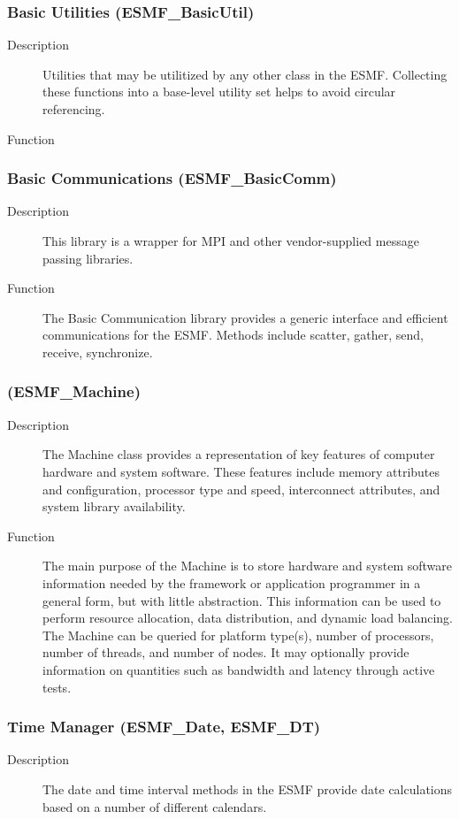 \subsubsection{Basic Utilities (ESMF\_BasicUtil)} 
\begin{description}
\item [Description] Utilities that may be utilitized by any other class in the ESMF.  
Collecting these functions into a base-level utility set helps to 
avoid circular referencing.
\item [Function] 
\end{description}

\subsubsection{Basic Communications (ESMF\_BasicComm)}
\begin{description}
\item [Description] This library is a wrapper for MPI and other vendor-supplied 
message passing libraries.
\item [Function] The Basic Communication library provides a generic interface
and efficient communications for the ESMF.  Methods include scatter, gather, send,
receive, synchronize. 
\end{description}

\subsubsection{ (ESMF\_Machine)} 
\begin{description}
\item [Description] The Machine class provides a representation of 
key features of computer hardware and system software.  These
features include memory attributes and configuration, processor type and speed,
interconnect attributes, and system library availability.
\item [Function]
The main purpose of the Machine is to store hardware and system software
information needed by the framework or application programmer in a general
form, but with little abstraction.  This information can be used to perform resource 
allocation, data distribution, and dynamic load balancing.  The Machine can be queried
for platform type(s), number of processors, number of threads, and number of 
nodes.  It may optionally provide information on quantities such as bandwidth and 
latency through active tests.  
\end{description}

\subsubsection{Time Manager (ESMF\_Date, ESMF\_DT)}
\begin{description}
\item [Description] The date and time interval methods in the ESMF provide date
calculations based on a number of different calendars.

\end{description}
















